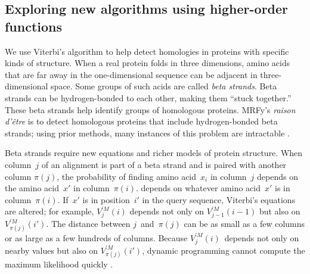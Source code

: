 \documentclass[]{jfp1}
\newcommand\pairedwith[1]{{\pi(#1)}}
\newcommand\seclabel[1]{\label{sec:#1}}
\let\cite\citep
\begin{document}
\subsection{Exploring new algorithms using higher-order functions}

\seclabel{hofs}
\seclabel{mrfy}

We use Viterbi's algorithm to help detect
homologies in proteins with specific kinds of structure.
When a real protein folds in three dimensions, 
amino acids 
that are far away in the one-dimensional sequence can be
adjacent in three-dimensional space.
Some groups of such acids are called \emph{beta strands}.
Beta strands
can be hydrogen-bonded to each other,
making them ``stuck together.''
These beta strands help identify groups of homologous
proteins.
MRFy's \emph{raison d'\^etre} is to detect homologous proteins that
include hydrogen-bonded beta 
strands; using prior methods, many instances of this problem are
intractable \cite{daniels:thesis}. 

Beta strands require new equations and
richer models of protein structure.
When column~$j$ of an alignment is part of a beta strand and is paired
with another column  $\pairedwith j$,
the probability of finding amino acid~$x_i$ in column~$j$ 
\ifpagetuning
depends on the amino acid~$x'$ in column~${\pairedwith i}$.
\else
depends on whatever amino acid~$x'$  is in column~${\pairedwith i}$.
\fi
If~$x'$ is in position~$i'$ in the query sequence, Viterbi's
equations are altered; for example,
$V_{j}^{\prime M}(i)$ depends not only on
$V_{j-1}^{\prime M}(i-1)$ but also on
$V_{\pairedwith j}^{\prime M}(i')$.
The distance between $j$~and~$\pairedwith j$ can be as small as a few
columns or as large as a few hundreds of columns.
Because $V_j^{\prime M}(i)$~depends not only on nearby values but also on
$V_{\pairedwith j}^{\prime M}(i')$,
dynamic programming cannot compute the maximum likelihood quickly 
\cite{Menke:2010ti,Daniels:2012}.
\end{document}
